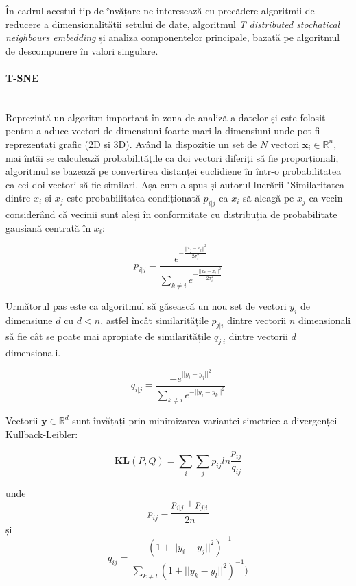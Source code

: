 În cadrul acestui tip de învățare ne interesează cu precădere algoritmii de reducere a dimensionalității setului de date, algoritmul \textit{T distributed stochatical neighbours embedding} și analiza componentelor principale, bazată pe algoritmul de descompunere în valori singulare.

\paragraph{T-SNE} \mbox{} \\

Reprezintă un algoritm important în zona de analiză a datelor și este folosit pentru a aduce vectori de dimensiuni foarte mari la dimensiuni unde pot fi reprezentați grafic (2D și 3D). Având la dispoziție un set de $N$ vectori $\mathbf{x}_i \in \mathbb{R}^n$, mai întâi se calculează probabilitățile ca doi vectori diferiți să fie proporționali, algoritmul se bazează pe convertirea distanței euclidiene în într-o probabilitatea ca cei doi vectori să fie similari. Așa cum a spus și autorul lucrării \cite{tsne} "Similaritatea dintre $x_i$ și $x_j$ este probabilitatea condiționată $p_{i|j}$ ca $x_i$ să aleagă pe $x_j$ ca vecin considerând că vecinii sunt aleși în conformitate cu distribuția de probabilitate gausiană centrată în $x_i$:

\begin{equation}
    p_{i|j} = \frac{e^{- \frac{||x_j - x_i||^2}{2\sigma_i^2}}}{\sum_{k\neq i} e^{-\frac{||x_k - x_i||^2}{2\sigma_{i}^{2}}}}
\end{equation}

Următorul pas este ca algoritmul să găsească un nou set de vectori $y_i$ de dimensiune $d$ cu $d < n$, astfel încât similaritățile $p_{j|i}$ dintre vectorii $n$ dimensionali să fie cât se poate mai apropiate de similaritățile $q_{j|i}$ dintre vectorii $d$ dimensionali.

\begin{equation}
    q_{i|j} = \frac{-e^{||y_i - y_j||^2}}{\sum_{k \neq i} e^{- ||y_i - y_k||^2}} 
\end{equation}

Vectorii $\mathbf{y} \in \mathbb{R}^d$ sunt învățați prin minimizarea variantei simetrice a divergenței Kullback-Leibler:

\begin{equation}
    \mathbf{KL}(P, Q) = \sum_{i} \sum_{j} p_{ij}ln\frac{p_{ij}}{q_{ij}}
\end{equation}

unde 
\begin{equation}
    p_{ij} = \frac{p_{i|j} + p_{j|i}}{2n}
\end{equation}
și
\begin{equation}
q_{ij} = \frac{(1+||y_i - y_j||^2)^{-1}}{\sum_{k \neq l} (1 + ||y_k - y_l||^2)^{-1})}
\end{equation}

